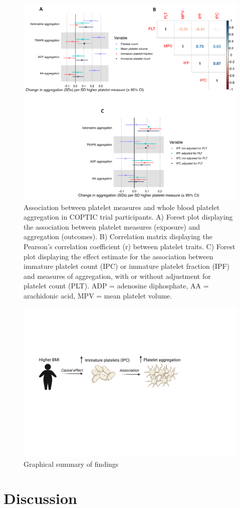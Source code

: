 \documentclass[11pt,twoside]{bristolthesis}
\begin{document}
\begin{figure}
\includegraphics[width=0.85\linewidth,height=0.7\textheight]{figure/BMI_platelets/IPC_aggregation} \caption[Association between platelet measures and whole blood platelet aggregation in COPTIC trial participants]{Association between platelet measures and whole blood platelet aggregation in COPTIC trial participants. A) Forest plot displaying the association between platelet measures (exposure) and aggregation (outcomes). B) Correlation matrix displaying the Pearson’s correlation coefficient (r) between platelet traits. C) Forest plot displaying the effect estimate for the association between immature platelet count (IPC) or immature platelet fraction (IPF) and measures of aggregation, with or without adjustment for platelet count (PLT). ADP = adenosine diphosphate, AA = arachidonic acid, MPV = mean platelet volume.}\label{fig:IPC-aggregation}
\end{figure}
\begin{figure}
\includegraphics[width=0.85\linewidth,height=0.8\textheight]{figure/BMI_platelets/Visual_abstract} \caption{Graphical summary of findings}\label{fig:BMI-platelet-cartoon}
\end{figure}
\hypertarget{discussion}{%
\section{Discussion}\label{discussion}}
\end{document}
